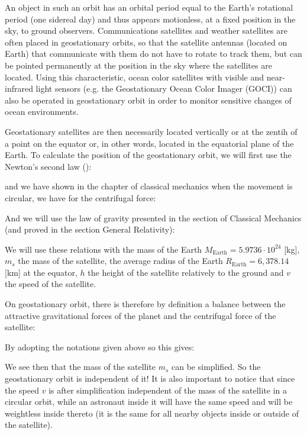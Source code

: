 	An object in such an orbit has an orbital period equal to the Earth's rotational period (one sidereal day) and thus appears motionless, at a fixed position in the sky, to ground observers. Communications satellites and weather satellites are often placed in geostationary orbits, so that the satellite antennas (located on Earth) that communicate with them do not have to rotate to track them, but can be pointed permanently at the position in the sky where the satellites are located. Using this characteristic, ocean color satellites with visible and near-infrared light sensors (e.g. the Geostationary Ocean Color Imager (GOCI)) can also be operated in geostationary orbit in order to monitor sensitive changes of ocean environments.
	
	Geostationary satellites are then necessarily located vertically or at the zentih of a point on the equator or, in other words, located in the equatorial plane of the Earth.
	To calculate the position of the geostationary orbit, we will first use the Newton's second law ():
	
	and we have shown in the chapter of classical mechanics when the movement is circular, we have for the centrifugal force:
	
	And we will use the law of gravity presented in the section of Classical Mechanics (and proved in the section General Relativity):
	
	We will use these relations with the mass of the Earth $M_\text{Earth}=5.9736\cdot 10^{24}$ [kg], $m_s$ the mass of the satellite, the average radius of the Earth $R_\text{Earth}=6,378.14$ [km] at the equator, $h$ the height of the satellite relatively to the ground and $v$ the speed of the satellite.
	
	On geostationary orbit, there is therefore by definition a balance between the attractive gravitational forces of the planet and the centrifugal force of the satellite:
	
	By adopting the notations given above so this gives:
	
	We see then that the mass of the satellite $m_s$ can be simplified. So the geostationary orbit is independent of it! It is also important to notice that since the speed $v$ is after simplification independent of the mass of the satellite in a circular orbit, while an astronaut inside it will have the same speed and will be weightless inside thereto (it is the same for all nearby objects inside or outside of the satellite).
	
